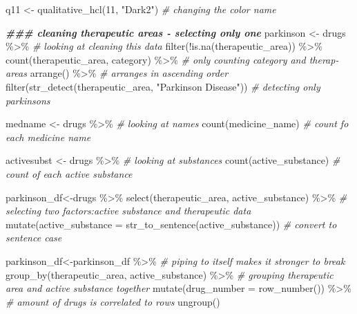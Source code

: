 \documentclass[
]{article}
\newenvironment{Shaded}{\begin{snugshade}}{\end{snugshade}}
\newcommand{\AttributeTok}[1]{\textcolor[rgb]{0.77,0.63,0.00}{#1}}
\newcommand{\CommentTok}[1]{\textcolor[rgb]{0.56,0.35,0.01}{\textit{#1}}}
\newcommand{\DecValTok}[1]{\textcolor[rgb]{0.00,0.00,0.81}{#1}}
\newcommand{\DocumentationTok}[1]{\textcolor[rgb]{0.56,0.35,0.01}{\textbf{\textit{#1}}}}
\newcommand{\FunctionTok}[1]{\textcolor[rgb]{0.00,0.00,0.00}{#1}}
\newcommand{\NormalTok}[1]{#1}
\newcommand{\OtherTok}[1]{\textcolor[rgb]{0.56,0.35,0.01}{#1}}
\newcommand{\SpecialCharTok}[1]{\textcolor[rgb]{0.00,0.00,0.00}{#1}}
\newcommand{\StringTok}[1]{\textcolor[rgb]{0.31,0.60,0.02}{#1}}
\begin{document}
\begin{Shaded}
\begin{Highlighting}[]
\NormalTok{q11 }\OtherTok{\textless{}{-}} \FunctionTok{qualitative\_hcl}\NormalTok{(}\DecValTok{11}\NormalTok{, }\StringTok{"Dark2"}\NormalTok{) }\CommentTok{\# changing the color name}

\DocumentationTok{\#\#\# cleaning therapeutic areas {-} selecting only one}
\NormalTok{ parkinson }\OtherTok{\textless{}{-}}\NormalTok{ drugs }\SpecialCharTok{\%\textgreater{}\%} \CommentTok{\# looking at cleaning this data}
 \FunctionTok{filter}\NormalTok{(}\SpecialCharTok{!}\FunctionTok{is.na}\NormalTok{(therapeutic\_area)) }\SpecialCharTok{\%\textgreater{}\%}
  \FunctionTok{count}\NormalTok{(therapeutic\_area, category) }\SpecialCharTok{\%\textgreater{}\%} \CommentTok{\# only counting category and therap{-}areas }
  \FunctionTok{arrange}\NormalTok{() }\SpecialCharTok{\%\textgreater{}\%} \CommentTok{\# arranges in ascending order}
  \FunctionTok{filter}\NormalTok{(}\FunctionTok{str\_detect}\NormalTok{(therapeutic\_area, }\StringTok{"Parkinson Disease"}\NormalTok{)) }\CommentTok{\#  detecting only parkinsons}
 
\NormalTok{ medname }\OtherTok{\textless{}{-}}\NormalTok{ drugs }\SpecialCharTok{\%\textgreater{}\%}  \CommentTok{\# looking at names}
  \FunctionTok{count}\NormalTok{(medicine\_name) }\CommentTok{\# count fo each medicine name}
   
\NormalTok{ activesubst }\OtherTok{\textless{}{-}}\NormalTok{ drugs }\SpecialCharTok{\%\textgreater{}\%} \CommentTok{\# looking at substances}
  \FunctionTok{count}\NormalTok{(active\_substance) }\CommentTok{\# count of each active substance}
 
\NormalTok{parkinson\_df}\OtherTok{\textless{}{-}}\NormalTok{drugs }\SpecialCharTok{\%\textgreater{}\%} 
  \FunctionTok{select}\NormalTok{(therapeutic\_area, active\_substance) }\SpecialCharTok{\%\textgreater{}\%} \CommentTok{\# selecting two factors:active substance and therapeutic data}
  \FunctionTok{mutate}\NormalTok{(}\AttributeTok{active\_substance =} \FunctionTok{str\_to\_sentence}\NormalTok{(active\_substance)) }\CommentTok{\# convert to sentence case}

\NormalTok{parkinson\_df}\OtherTok{\textless{}{-}}\NormalTok{parkinson\_df }\SpecialCharTok{\%\textgreater{}\%}  \CommentTok{\# piping to itself makes it stronger to break}
  \FunctionTok{group\_by}\NormalTok{(therapeutic\_area, active\_substance) }\SpecialCharTok{\%\textgreater{}\%} \CommentTok{\# grouping therapeutic area and active substance together}
  \FunctionTok{mutate}\NormalTok{(}\AttributeTok{drug\_number =} \FunctionTok{row\_number}\NormalTok{()) }\SpecialCharTok{\%\textgreater{}\%} \CommentTok{\# amount of drugs is correlated to rows}
  \FunctionTok{ungroup}\NormalTok{() }
 

\end{Highlighting}
\end{Shaded}
\end{document}
